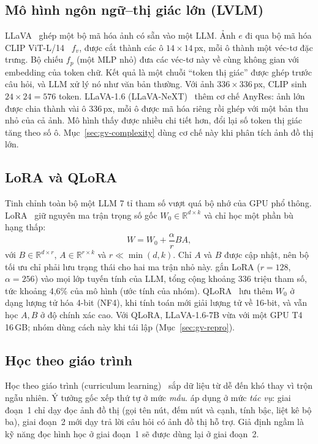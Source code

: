 \subsection{Mô hình ngôn ngữ--thị giác lớn (LVLM)}
LLaVA~\cite{liu2023llava} ghép một bộ mã hóa ảnh có sẵn vào một LLM. Ảnh $e$ đi qua bộ mã hóa CLIP ViT-L/14~\cite{radford2021clip} $f_v$, được cắt thành các ô $14\times14$\,px, mỗi ô thành một véc-tơ đặc trưng. Bộ chiếu $f_p$ (một MLP nhỏ) đưa các véc-tơ này về cùng không gian với embedding của token chữ. Kết quả là một chuỗi ``token thị giác'' được ghép trước câu hỏi, và LLM xử lý nó như văn bản thường. Với ảnh $336\times336$\,px, CLIP sinh $24\times24=576$ token. LLaVA-1.6 (LLaVA-NeXT)~\cite{liu2024llavanext} thêm cơ chế AnyRes: ảnh lớn được chia thành vài ô 336\,px, mỗi ô được mã hóa riêng rồi ghép với một bản thu nhỏ của cả ảnh. Mô hình thấy được nhiều chi tiết hơn, đổi lại số token thị giác tăng theo số ô. Mục~\ref{sec:gv-complexity} dùng cơ chế này khi phân tích ảnh đồ thị lớn.

\subsection{LoRA và QLoRA}
Tinh chỉnh toàn bộ một LLM 7 tỉ tham số vượt quá bộ nhớ của GPU phổ thông. LoRA~\cite{hu2022lora} giữ nguyên ma trận trọng số gốc $W_0\in\mathbb{R}^{d\times k}$ và chỉ học một phần bù hạng thấp:
\begin{equation}
W=W_0+\frac{\alpha}{r}BA,
\end{equation}
với $B\in\mathbb{R}^{d\times r}$, $A\in\mathbb{R}^{r\times k}$ và $r\ll\min(d,k)$.
Chỉ $A$ và $B$ được cập nhật, nên bộ tối ưu chỉ phải lưu trạng thái cho hai ma trận nhỏ này. \GV{} gắn LoRA ($r=128$, $\alpha=256$) vào mọi lớp tuyến tính của LLM, tổng cộng khoảng 336 triệu tham số, tức khoảng 4,6\% của mô hình (ước tính của nhóm). QLoRA~\cite{dettmers2023qlora} lưu thêm $W_0$ ở dạng lượng tử hóa 4-bit (NF4), khi tính toán mới giải lượng tử về 16-bit, và vẫn học $A,B$ ở độ chính xác cao. Với QLoRA, LLaVA-1.6-7B vừa với một GPU T4 16\,GB; nhóm dùng cách này khi tái lập (Mục~\ref{sec:gv-repro}).

\subsection{Học theo giáo trình}
Học theo giáo trình (curriculum learning)~\cite{bengio2009curriculum} sắp dữ liệu từ dễ đến khó thay vì trộn ngẫu nhiên. Ý tưởng gốc xếp thứ tự ở mức \emph{mẫu}. \GV{} áp dụng ở mức \emph{tác vụ}: giai đoạn~1 chỉ dạy đọc ảnh đồ thị (gọi tên nút, đếm nút và cạnh, tính bậc, liệt kê bộ ba), giai đoạn~2 mới dạy trả lời câu hỏi có ảnh đồ thị hỗ trợ. Giả định ngầm là kỹ năng đọc hình học ở giai đoạn~1 sẽ được dùng lại ở giai đoạn~2.
